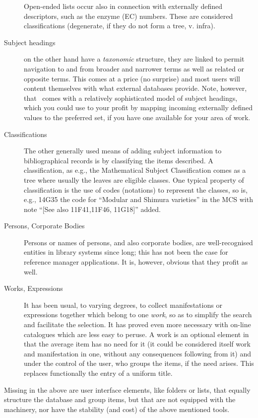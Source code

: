 \begin{description}
  Open-ended lists occur also in connection with externally defined
  descriptors, such as the enzyme (EC) numbers. These are considered
  classifications (degenerate, if they do not form a tree, v. infra).
\item[Subject headings] on the other hand have a \textit{taxonomic}
  structure, they are linked to permit navigation to and from broader
  and narrower terms as well as related or opposite terms.  This comes
  at a price (no surprise) and most users will content themselves with
  what external databases provide.  Note, however, that \Pyb\ comes
  with a relatively sophisticated model of subject headings, which you
  could use to your profit by mapping incoming externally defined
  values to the preferred set, if you have one available for your area
  of work. 
\item[Classifications] The other generally used means of adding
  subject information to bibliographical records is by classifying the
  items described.  A classification, as e.g., the Mathematical
  Subject Classification \citep{MCS2000} comes as a tree where usually
  the leaves are eligible classes.  One typical property of
  classification is the use of codes (notations) to represent the
  classes, so is, e.g., \textsf{14G35} the code for ``Modular and
  Shimura varieties'' in the MCS with note ``[See also \textsf{11F41,11F46,
  11G18}]'' added. 
\item[Persons, Corporate Bodies] Persons or names of persons, and also
  corporate bodies, are well-recognised entities in library systems
  since long; this has not been the case for reference manager
  applications.  It is, however, obvious that they profit as well. 
\item[Works, Expressions] It has been usual, to varying degrees, to
  collect manifestations or expressions together which belong to one
  \textit{work}, so as to simplify the search and facilitate the
  selection.  It has proved even more necessary with on-line
  catalogues which are less easy to peruse.  A work is an optional
  element in that the average item has no need for it (it could be
  considered itself work and manifestation in one, without any
  consequences following from it) and under the control of the user,
  who groups the items, if the need arises.  This replaces
  functionally the entry of a uniform title.  
\end{description}\noindent

Missing in the above are user interface elements, like folders or
lists, that equally structure the database  and group items, but  that
are not equipped with the machinery, nor have the stability (and cost)
of the above mentioned tools.

